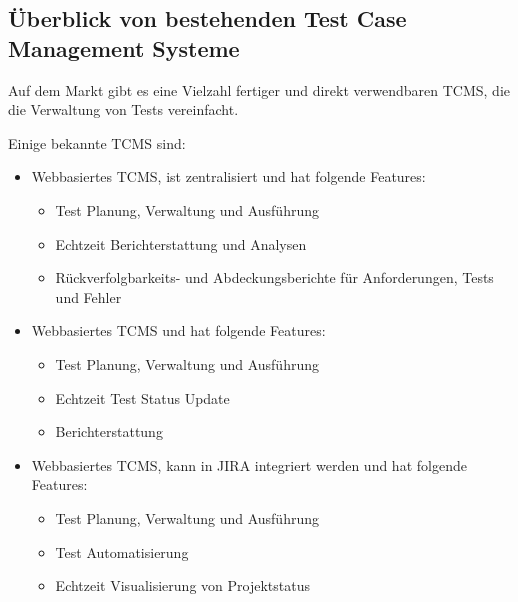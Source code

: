 \documentclass[a4paper, fontsize=11pt, parskip=half, twoside]{scrreprt}
\begin{document}
	\textcite{lead_articles_nodate}
	
	\subsection{Überblick von bestehenden Test Case Management Systeme}
	Auf dem Markt gibt es eine Vielzahl fertiger und direkt verwendbaren \ac{TCMS}, die die Verwaltung von Tests vereinfacht.
	
	Einige bekannte \ac{TCMS} sind:
	
	\begin{itemize}
		\item \textcite{noauthor_testrail_2023} 
		
		Webbasiertes \ac{TCMS}, ist zentralisiert und hat folgende Features:
		
		\begin{itemize}
			\setlength\itemsep{-0.5em}
			\item Test Planung, Verwaltung und Ausführung 
			\item Echtzeit Berichterstattung und Analysen
			\item Rückverfolgbarkeits- und Abdeckungsberichte für Anforderungen, Tests und Fehler
		\end{itemize}
		
		\item \textcite{noauthor_tricentis_nodate} 
		
		Webbasiertes \ac{TCMS} und hat folgende Features:
		
		\begin{itemize}
			\setlength\itemsep{-0.5em}
			\item Test Planung, Verwaltung und Ausführung 
			\item Echtzeit Test Status Update
			\item Berichterstattung
		\end{itemize}
		
		\item \textcite{noauthor_zephyr_nodate} 
		
		Webbasiertes \ac{TCMS}, kann in JIRA integriert werden und hat folgende Features:
		
		\begin{itemize}
			\setlength\itemsep{-0.5em}
			\item Test Planung, Verwaltung und Ausführung 
			\item Test Automatisierung
			\item Echtzeit Visualisierung von Projektstatus
		\end{itemize}
		

\end{itemize}
\end{document}
